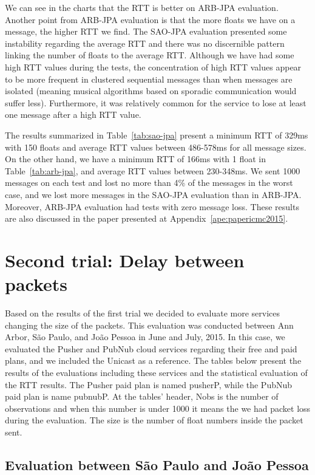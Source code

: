 We can see in the charts that the RTT is better on ARB-JPA evaluation.
Another point from ARB-JPA evaluation is that the more floats we have on a message, the higher RTT we find.
The SAO-JPA evaluation presented some instability regarding the average RTT and there was no discernible pattern linking the number of floats to the average RTT.
Although we have had some high RTT values during the tests, the concentration of high RTT values appear to be more frequent in clustered sequential messages than when messages are isolated (meaning musical algorithms based on sporadic communication would suffer less). Furthermore, it was relatively common for the service to lose at least one message after a high RTT value.

The results summarized in Table~\ref{tab:sao-jpa} present a minimum RTT of 329ms with 150 floats and average RTT values between 486-578ms for all message sizes.
On the other hand, we have a minimum RTT of 166ms with 1 float in Table~\ref{tab:arb-jpa}, and average RTT values between 230-348ms.
We sent 1000 messages on each test and lost no more than 4\% of the messages in the worst case, and we lost more messages in the SAO-JPA evaluation than in ARB-JPA.
Moreover, ARB-JPA evaluation had tests with zero message loss.
These results are also discussed in the paper presented at Appendix~\ref{ape:papericmc2015}.

\section{Second trial: Delay between packets}
\label{sec:secondtrial}

Based on the results of the first trial we decided to evaluate more services changing the size of the packets.
This evaluation was conducted between Ann Arbor, São Paulo, and João Pessoa in June and July, 2015.
In this case, we evaluated the Pusher and PubNub cloud services regarding their free and paid plans, and we included the Unicast as a reference.
The tables below present the results of the evaluations including these services and the statistical evaluation of the RTT results.
The Pusher paid plan is named pusherP, while the PubNub paid plan is name pubnubP.
At the tables' header, Nobs is the number of observations and when this number is under 1000 it means the we had packet loss during the evaluation.
The size is the number of float numbers inside the packet sent.


\subsection*{Evaluation between São Paulo and João Pessoa} 

